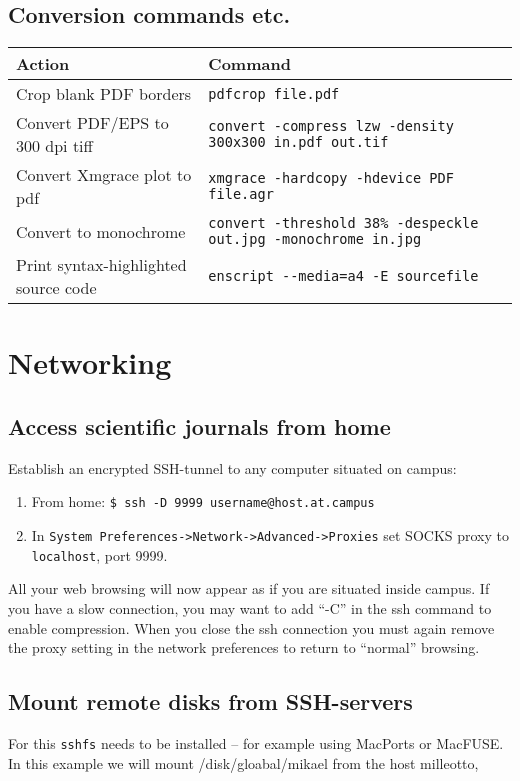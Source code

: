 \documentclass[a4paper,10pt]{article}
\begin{document}
\subsection{Conversion commands etc.}
\begin{table}[h!]
\center
\begin{tabular}{ll}\hline\hline
Action              & Command \\\hline
Crop blank PDF borders & \verb"pdfcrop file.pdf" \\
Convert PDF/EPS to 300 dpi tiff & \verb"convert -compress lzw -density 300x300 in.pdf out.tif" \\
Convert Xmgrace plot to pdf     & \verb"xmgrace -hardcopy -hdevice PDF file.agr"\\
Convert to monochrome           & \verb"convert -threshold 38% -despeckle out.jpg -monochrome in.jpg"\\
Print syntax-highlighted source code & \verb"enscript --media=a4 -E sourcefile"\\\hline
\end{tabular}\end{table}



\section{Networking}
\subsection{Access scientific journals from home}
Establish an encrypted SSH-tunnel to any computer situated on campus:
\begin{enumerate}
\item From home: \verb+$ ssh -D 9999 username@host.at.campus+
\item In \verb+System Preferences->Network->Advanced->Proxies+ set SOCKS proxy to \verb+localhost+, port 9999.
\end{enumerate}
All your web browsing will now appear as if you are situated inside campus. If you have a slow connection, you may want to add ``-C'' in the ssh command to enable compression.  When you close the ssh connection you must again remove the proxy setting in the network preferences to return to ``normal'' browsing.

\subsection{Mount remote disks from SSH-servers}
For this \verb+sshfs+ needs to be installed -- for example using MacPorts or MacFUSE. In this example we will mount /disk/gloabal/mikael from the host milleotto,\\
\end{document}
